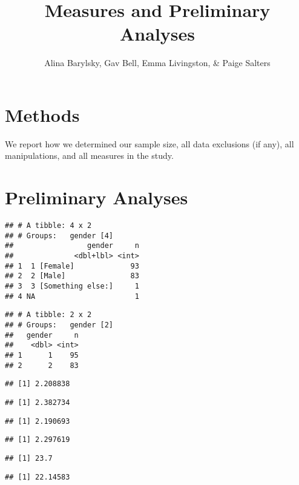 \documentclass[man]{apa6}
\title{Measures and Preliminary Analyses}
\author{Alina Barylsky, Gav Bell, Emma Livingston, \& Paige Salters}
\date{}
\affiliation{
\vspace{0.5cm}
}
\begin{document}
\maketitle

\hypertarget{methods}{%
\section{Methods}\label{methods}}

We report how we determined our sample size, all data exclusions (if any), all manipulations, and all measures in the study.

\hypertarget{preliminary-analyses}{%
\section{Preliminary Analyses}\label{preliminary-analyses}}

\begin{verbatim}
## # A tibble: 4 x 2
## # Groups:   gender [4]
##                 gender     n
##              <dbl+lbl> <int>
## 1  1 [Female]             93
## 2  2 [Male]               83
## 3  3 [Something else:]     1
## 4 NA                       1
\end{verbatim}

\begin{verbatim}
## # A tibble: 2 x 2
## # Groups:   gender [2]
##   gender     n
##    <dbl> <int>
## 1      1    95
## 2      2    83
\end{verbatim}

\begin{verbatim}
## [1] 2.208838
\end{verbatim}

\begin{verbatim}
## [1] 2.382734
\end{verbatim}

\begin{verbatim}
## [1] 2.190693
\end{verbatim}

\begin{verbatim}
## [1] 2.297619
\end{verbatim}

\begin{verbatim}
## [1] 23.7
\end{verbatim}

\begin{verbatim}
## [1] 22.14583
\end{verbatim}
\end{document}

